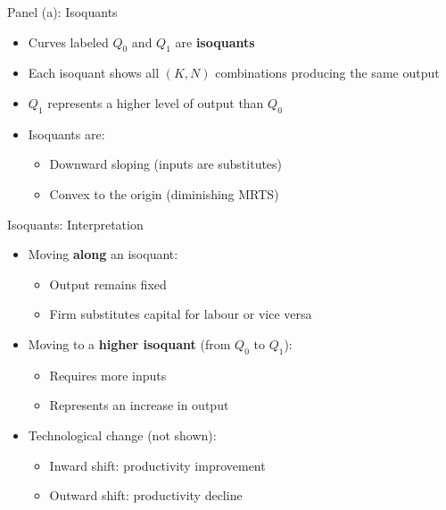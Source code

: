\documentclass[aspectratio=169]{beamer}
\begin{document}

\begin{frame}{Panel (a): Isoquants}
\begin{itemize}[<+->]
\item Curves labeled $Q_0$ and $Q_1$ are \textbf{isoquants}
\item Each isoquant shows all $(K,N)$ combinations producing the same output
\item $Q_1$ represents a higher level of output than $Q_0$
\item Isoquants are:
\begin{itemize}[<+->]
\item Downward sloping (inputs are substitutes)
\item Convex to the origin (diminishing MRTS)
\end{itemize}
\end{itemize}
\end{frame}


\begin{frame}{Isoquants: Interpretation}
\begin{itemize}[<+->]
\item Moving \textbf{along} an isoquant:
\begin{itemize}[<+->]
\item Output remains fixed
\item Firm substitutes capital for labour or vice versa
\end{itemize}
\item Moving to a \textbf{higher isoquant} (from $Q_0$ to $Q_1$):
\begin{itemize}[<+->]
\item Requires more inputs
\item Represents an increase in output
\end{itemize}
\item Technological change (not shown):
\begin{itemize}[<+->]
\item Inward shift: productivity improvement
\item Outward shift: productivity decline
\end{itemize}
\end{itemize}
\end{frame}

\end{document}
